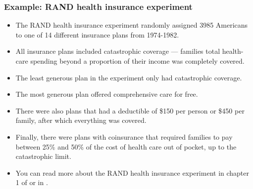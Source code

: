 \begin{frame}\frametitle{Example: RAND health insurance experiment}
\begin{itemize}
\item The RAND health insurance experiment randomly assigned 3985 Americans
to one of 14 different insurance plans from 1974-1982. 
\item All insurance
plans included catastrophic coverage --- families total health-care
spending beyond a proportion of their income was completely
covered. 
\item The least generous plan in the experiment only had
catastrophic coverage. 
\item The most generous plan offered comprehensive
care for free. 
\item There were also plans that had a deductible of \$150
per person or \$450 per family, after which everything was
covered. 
\item Finally, there were plans with coinsurance that required
families to pay between 25\% and 50\% of the cost of health care out
of pocket, up to the catastrophic limit.  
\item You can read more about the
RAND health insurance experiment in chapter 1 of \cite{ap2014} or in
\cite{rand2013}.

\end{itemize}
\end{frame}







